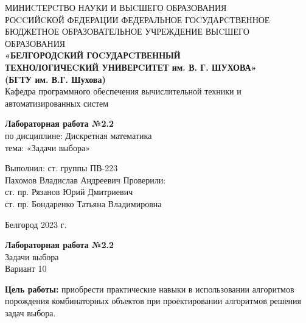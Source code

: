 \documentclass[a4paper,14pt]{extarticle}
\newcommand\textbox[1]{
	\parbox{.45\textwidth}{#1}
}
\begin{document}
	
	\begin{center}
		\small{
			МИНИCТЕРCТВО НАУКИ И ВЫCШЕГО ОБРАЗОВАНИЯ \\РОCCИЙCКОЙ ФЕДЕРАЦИИ
			\bigbreak
			ФЕДЕРАЛЬНОЕ ГОCУДАРCТВЕННОЕ БЮДЖЕТНОЕ ОБРАЗОВАТЕЛЬНОЕ УЧРЕЖДЕНИЕ ВЫCШЕГО ОБРАЗОВАНИЯ \\
			\bigbreak
			\textbf{«БЕЛГОРОДCКИЙ ГОCУДАРCТВЕННЫЙ \\ТЕХНОЛОГИЧЕCКИЙ УНИВЕРCИТЕТ им. В. Г. ШУХОВА»\\ (БГТУ им. В.Г. Шухова)} \\
			\bigbreak
			Кафедра программного обеспечения вычислительной техники и автоматизированных систем\\}
	\end{center}
	
	\vfill
	\begin{center}
		\large{
			\textbf{
				Лабораторная работа №2.2}}\\
		\normalsize{
			по дисциплине: Дискретная математика \\
			тема: «Задачи выбора»}
	\end{center}
	\vfill
	\hfill\textbox{
		Выполнил: ст. группы ПВ-223\\Пахомов Владислав Андреевич
		\bigbreak
		Проверили: \\ст. пр. Рязанов Юрий Дмитриевич\\
		ст. пр. Бондаренко Татьяна Владимировна
	}
	\vfill\begin{center}
		Белгород 2023 г.
	\end{center}
	\newpage
	\begin{center}
		\textbf{Лабораторная работа №2.2}\\
		Задачи выбора\\
		Вариант 10
	\end{center}
	\textbf{Цель работы: }приобрести практические навыки в использовании алгоритмов порождения комбинаторных объектов при проектировании алгоритмов решения задач выбора.
\end{document}
